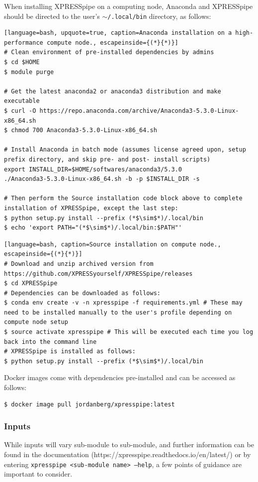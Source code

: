 \documentclass[11pt, a4paper, oneside]{article}
\begin{document}
When installing XPRESSpipe on a computing node, Anaconda and XPRESSpipe should be directed to the user's \texttt{$\sim$/.local/bin} directory, as follows:

\begin{lstlisting}[language=bash, upquote=true, caption=Anaconda installation on a high-performance compute node., escapeinside={(*}{*)}]
# Clean environment of pre-installed dependencies by admins
$ cd $HOME
$ module purge

# Get the latest anaconda2 or anaconda3 distribution and make executable
$ curl -O https://repo.anaconda.com/archive/Anaconda3-5.3.0-Linux-x86_64.sh
$ chmod 700 Anaconda3-5.3.0-Linux-x86_64.sh

# Install Anaconda in batch mode (assumes license agreed upon, setup prefix directory, and skip pre- and post- install scripts)
export INSTALL_DIR=$HOME/softwares/anaconda3/5.3.0
./Anaconda3-5.3.0-Linux-x86_64.sh -b -p $INSTALL_DIR -s

# Then perform the Source installation code block above to complete installation of XPRESSpipe, except the last step:
$ python setup.py install --prefix (*$\sim$*)/.local/bin
$ echo 'export PATH="(*$\sim$*)/.local/bin:$PATH"'
\end{lstlisting}


\begin{lstlisting}[language=bash, caption=Source installation on compute node., escapeinside={(*}{*)}]
# Download and unzip archived version from https://github.com/XPRESSyourself/XPRESSpipe/releases
$ cd XPRESSpipe
# Dependencies can be downloaded as follows:
$ conda env create -v -n xpresspipe -f requirements.yml # These may need to be installed manually to the user's profile depending on compute node setup
$ source activate xpresspipe # This will be executed each time you log back into the command line
# XPRESSpipe is installed as follows:
$ python setup.py install --prefix (*$\sim$*)/.local/bin
\end{lstlisting}

Docker images come with dependencies pre-installed and can be accessed as follows:

\begin{lstlisting}[language=bash, caption=Docker installation]
$ docker image pull jordanberg/xpresspipe:latest
\end{lstlisting}

\subsubsection{Inputs}
While inputs will vary sub-module to sub-module, and further information can be found in the documentation (https://xpresspipe.readthedocs.io/en/latest/) or by entering \texttt{xpresspipe \textless sub-module name\textgreater \ --help}, a few points of guidance are important to consider.
\end{document}
